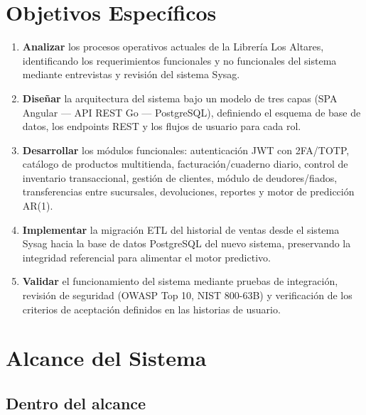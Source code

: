 \documentclass[12pt,a4paper,oneside]{report}
\begin{document}
\section{Objetivos Específicos}

\begin{enumerate}[leftmargin=1.5cm, label=\textbf{OE\arabic*.}]
  \item \textbf{Analizar} los procesos operativos actuales de la Librería Los Altares, identificando los requerimientos funcionales y no funcionales del sistema mediante entrevistas y revisión del sistema Sysag.
  \item \textbf{Diseñar} la arquitectura del sistema bajo un modelo de tres capas (SPA Angular — API REST Go — PostgreSQL), definiendo el esquema de base de datos, los endpoints REST y los flujos de usuario para cada rol.
  \item \textbf{Desarrollar} los módulos funcionales: autenticación JWT con 2FA/TOTP, catálogo de productos multitienda, facturación/cuaderno diario, control de inventario transaccional, gestión de clientes, módulo de deudores/fiados, transferencias entre sucursales, devoluciones, reportes y motor de predicción AR(1).
  \item \textbf{Implementar} la migración ETL del historial de ventas desde el sistema Sysag hacia la base de datos PostgreSQL del nuevo sistema, preservando la integridad referencial para alimentar el motor predictivo.
  \item \textbf{Validar} el funcionamiento del sistema mediante pruebas de integración, revisión de seguridad (OWASP Top 10, NIST 800-63B) y verificación de los criterios de aceptación definidos en las historias de usuario.
\end{enumerate}

\section{Alcance del Sistema}

\subsection{Dentro del alcance}
\end{document}
